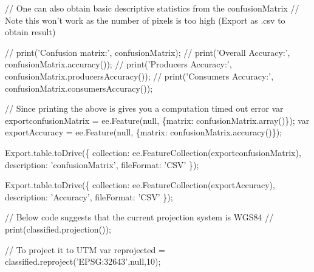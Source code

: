 \documentclass[]{article}
\newenvironment{Shaded}{}{}
\newcommand{\AttributeTok}[1]{#1}
\newcommand{\CommentTok}[1]{\textcolor[rgb]{0.00,0.50,0.00}{#1}}
\newcommand{\DataTypeTok}[1]{#1}
\newcommand{\DecValTok}[1]{#1}
\newcommand{\KeywordTok}[1]{\textcolor[rgb]{0.00,0.00,1.00}{#1}}
\newcommand{\NormalTok}[1]{#1}
\newcommand{\OperatorTok}[1]{#1}
\newcommand{\StringTok}[1]{\textcolor[rgb]{0.00,0.50,0.50}{#1}}
\newcommand{\VariableTok}[1]{#1}
\begin{document}
\begin{Shaded}
\begin{Highlighting}[numbers=left,,]
\CommentTok{// One can also obtain basic descriptive statistics from the confusionMatrix}
\CommentTok{// Note this won't work as the number of pixels is too high (Export as .csv to obtain result)}

\CommentTok{// print('Confusion matrix:', confusionMatrix);}
\CommentTok{// print('Overall Accuracy:', confusionMatrix.accuracy());}
\CommentTok{// print('Producers Accuracy:', confusionMatrix.producersAccuracy());}
\CommentTok{// print('Consumers Accuracy:', confusionMatrix.consumersAccuracy());}

\CommentTok{// Since printing the above is gives you a computation timed out error}
\KeywordTok{var}\NormalTok{ exportconfusionMatrix }\OperatorTok{=} \VariableTok{ee}\NormalTok{.}\AttributeTok{Feature}\NormalTok{(}\KeywordTok{null}\OperatorTok{,} \OperatorTok{\{}\DataTypeTok{matrix}\OperatorTok{:} \VariableTok{confusionMatrix}\NormalTok{.}\AttributeTok{array}\NormalTok{()}\OperatorTok{\}}\NormalTok{)}\OperatorTok{;} 
\KeywordTok{var}\NormalTok{ exportAccuracy }\OperatorTok{=} \VariableTok{ee}\NormalTok{.}\AttributeTok{Feature}\NormalTok{(}\KeywordTok{null}\OperatorTok{,} \OperatorTok{\{}\DataTypeTok{matrix}\OperatorTok{:} \VariableTok{confusionMatrix}\NormalTok{.}\AttributeTok{accuracy}\NormalTok{()}\OperatorTok{\}}\NormalTok{)}\OperatorTok{;} 

\VariableTok{Export}\NormalTok{.}\VariableTok{table}\NormalTok{.}\AttributeTok{toDrive}\NormalTok{(}\OperatorTok{\{}
  \DataTypeTok{collection}\OperatorTok{:} \VariableTok{ee}\NormalTok{.}\AttributeTok{FeatureCollection}\NormalTok{(exportconfusionMatrix)}\OperatorTok{,}
  \DataTypeTok{description}\OperatorTok{:} \StringTok{'confusionMatrix'}\OperatorTok{,}
  \DataTypeTok{fileFormat}\OperatorTok{:} \StringTok{'CSV'}
\OperatorTok{\}}\NormalTok{)}\OperatorTok{;}

\VariableTok{Export}\NormalTok{.}\VariableTok{table}\NormalTok{.}\AttributeTok{toDrive}\NormalTok{(}\OperatorTok{\{}
  \DataTypeTok{collection}\OperatorTok{:} \VariableTok{ee}\NormalTok{.}\AttributeTok{FeatureCollection}\NormalTok{(exportAccuracy)}\OperatorTok{,}
  \DataTypeTok{description}\OperatorTok{:} \StringTok{'Accuracy'}\OperatorTok{,}
  \DataTypeTok{fileFormat}\OperatorTok{:} \StringTok{'CSV'}
\OperatorTok{\}}\NormalTok{)}\OperatorTok{;}

\CommentTok{// Below code suggests that the current projection system is WGS84}
\CommentTok{// print(classified.projection());}

\CommentTok{// To project it to UTM}
\KeywordTok{var}\NormalTok{ reprojected }\OperatorTok{=} \VariableTok{classified}\NormalTok{.}\AttributeTok{reproject}\NormalTok{(}\StringTok{'EPSG:32643'}\OperatorTok{,}\KeywordTok{null}\OperatorTok{,}\DecValTok{10}\NormalTok{)}\OperatorTok{;}


\end{Highlighting}
\end{Shaded}
\end{document}
